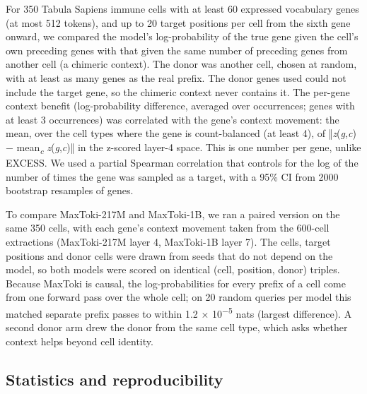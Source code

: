 \documentclass[
  11pt,
]{article}
\begin{document}
For 350 Tabula Sapiens immune cells with at least 60 expressed
vocabulary genes (at most 512 tokens), and up to 20 target positions per
cell from the sixth gene onward, we compared the model's log-probability
of the true gene given the cell's own preceding genes with that given
the same number of preceding genes from another cell (a chimeric
context). The donor was another cell, chosen at random, with at least as
many genes as the real prefix. The donor genes used could not include
the target gene, so the chimeric context never contains it. The per-gene
context benefit (log-probability difference, averaged over occurrences;
genes with at least 3 occurrences) was correlated with the gene's
context movement: the mean, over the cell types where the gene is
count-balanced (at least 4), of ‖\emph{z}(\emph{g},\emph{c}) −
mean\textsubscript{\emph{c}} \emph{z}(\emph{g},\emph{c})‖ in the
z-scored layer-4 space. This is one number per gene, unlike EXCESS. We
used a partial Spearman correlation that controls for the log of the
number of times the gene was sampled as a target, with a 95\% CI from
2000 bootstrap resamples of genes.

To compare MaxToki-217M and MaxToki-1B, we ran a paired version on the
same 350 cells, with each gene's context movement taken from the
600-cell extractions (MaxToki-217M layer 4, MaxToki-1B layer 7). The
cells, target positions and donor cells were drawn from seeds that do
not depend on the model, so both models were scored on identical (cell,
position, donor) triples. Because MaxToki is causal, the
log-probabilities for every prefix of a cell come from one forward pass
over the whole cell; on 20 random queries per model this matched
separate prefix passes to within 1.2 × 10\textsuperscript{−5} nats
(largest difference). A second donor arm drew the donor from the same
cell type, which asks whether context helps beyond cell identity.

\subsection{Statistics and
reproducibility}\label{statistics-and-reproducibility}
\end{document}
